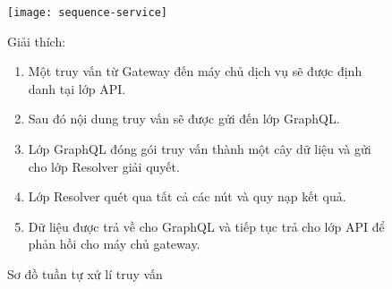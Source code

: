 \clearpage
\FloatBarrier
\begin{figure}[!htbp]
 	\centering
	\texttt{[image: sequence-service]}
	\caption{Sơ đồ tuần tự xử lí truy vấn}
	Giải thích:
	\begin{enumerate}
		\item Một truy vấn từ Gateway đến máy chủ dịch vụ sẽ được định danh tại lớp API.
		\item Sau đó nội dung truy vấn sẽ được gửi đến lớp GraphQL.
		\item Lớp GraphQL đóng gói truy vấn thành một cây dữ liệu và gửi cho lớp Resolver giải quyết.
		\item Lớp Resolver quét qua tất cả các nút và quy nạp kết quả.
		\item Dữ liệu được trả về cho GraphQL và tiếp tục trả cho lớp API để phản hồi cho máy chủ gateway.
	\end{enumerate}
\end{figure}

